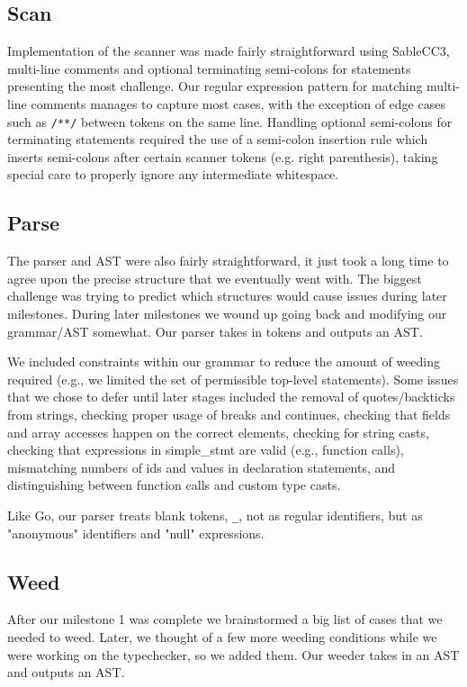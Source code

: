 \documentclass{article}
\begin{document}
\subsection{Scan}

Implementation of the scanner was made fairly straightforward using SableCC3, multi-line comments and optional terminating semi-colons for statements presenting the most challenge. Our regular expression pattern for matching multi-line comments manages to capture most cases, with the exception of edge cases such as \texttt{/**/} between tokens on the same line. Handling optional semi-colons for terminating statements required the use of a semi-colon insertion rule which inserts semi-colons after certain scanner tokens (e.g. right parenthesis), taking special care to properly ignore any intermediate whitespace.


\subsection{Parse}

The parser and AST were also fairly straightforward, it just took a long time to agree upon the precise structure that we eventually went with. The biggest challenge was trying to predict which structures would cause issues during later milestones. During later milestones we wound up going back and modifying our grammar/AST somewhat. Our parser takes in tokens and outputs an AST.

We included constraints within our grammar to reduce the amount of weeding required (e.g., we limited the set of permissible top-level statements). Some issues that we chose to defer until later stages included the removal of quotes/backticks from strings, checking proper usage of breaks and continues, checking that fields and array accesses happen on the correct elements, checking for string casts, checking that expressions in simple\_stmt are valid (e.g., function calls), mismatching numbers of ids and values in declaration statements, and distinguishing between function calls and custom type casts.

Like Go, our parser treats blank tokens, \texttt{\_}, not as regular identifiers, but as "anonymous" identifiers and "null" expressions.

\subsection{Weed}

After our milestone 1 was complete we brainstormed a big list of cases that we needed to weed. Later, we thought of a few more weeding conditions while we were working on the typechecker, so we added them. Our weeder takes in an AST and outputs an AST.
\end{document}
